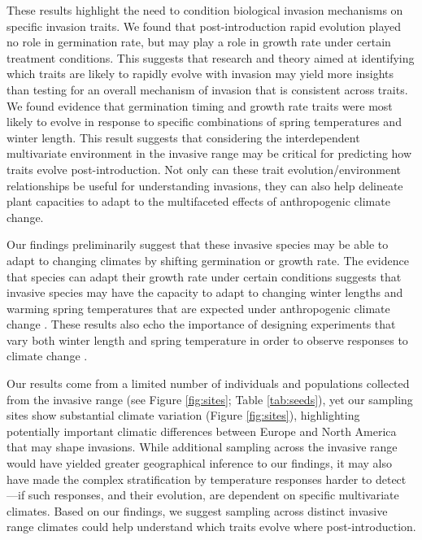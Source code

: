 \documentclass[12pt]{article}\usepackage[]{graphicx}\usepackage[]{color}
\begin{document}
	These results highlight the need to condition biological invasion mechanisms on specific invasion traits. We found that post-introduction rapid evolution played no role in germination rate, but may play a role in growth rate under certain treatment conditions. This suggests that research and theory aimed at identifying which traits are likely to rapidly evolve with invasion may yield more insights than testing for an overall mechanism of invasion that is consistent across traits. We found evidence that germination timing and growth rate traits were most likely to evolve in response to specific combinations of spring temperatures and winter length. This result suggests that considering the interdependent multivariate environment in the invasive range may be critical for predicting how traits evolve post-introduction. 
Not only can these trait evolution/environment relationships be useful for understanding invasions, they can also help delineate plant capacities to adapt to the multifaceted effects of anthropogenic climate change. 
	
	Our findings preliminarily suggest that these invasive species may be able to adapt to changing climates by shifting germination or growth rate. The evidence that species can adapt their growth rate under certain conditions suggests that invasive species may have the capacity to adapt to changing winter lengths and warming spring temperatures that are expected under anthropogenic climate change \parencite{IPCC2015}. These results also echo the  importance of designing experiments that vary both winter length and spring temperature in order to observe responses to climate change \parencite[e.g.,][]{Bernareggi2016}. 

	Our results come from a limited number of individuals and populations collected from the invasive range (see Figure \ref{fig:sites}; Table \ref{tab:seeds}), yet our sampling sites show substantial climate variation (Figure \ref{fig:sites}), highlighting potentially important climatic differences between Europe and North America that may shape invasions. While additional sampling across the invasive range would have yielded greater geographical inference to our findings, it may also have made the complex stratification by temperature responses harder to detect---if such responses, and their evolution, are dependent on specific multivariate climates. Based on our findings, we suggest sampling across distinct invasive range climates could help understand which traits evolve where post-introduction. %
\end{document}
